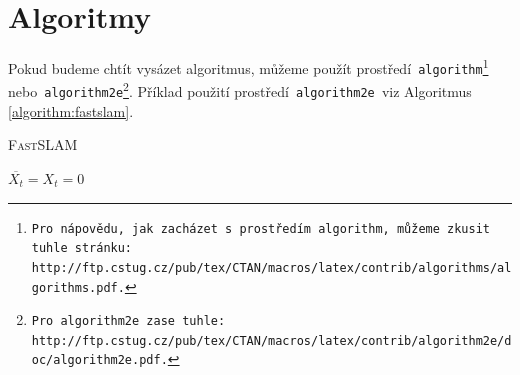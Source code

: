 \documentclass[a4paper, 11pt]{article}
\begin{document}
	\bigskip
	\pagebreak


	\section{Algoritmy}
	\label{section:algoritmy}

	Pokud budeme chtít vysázet algoritmus, můžeme použít prostředí\texttt{ algorithm\footnote{
		Pro nápovědu, jak zacházet s prostředím\texttt{ algorithm,} můžeme zkusit tuhle stránku: \\
		http://ftp.cstug.cz/pub/tex/CTAN/macros/latex/contrib/algorithms/algorithms.pdf.
	} }
	nebo\texttt{ algorithm2e\footnote{
		Pro\texttt{ algorithm2e }zase tuhle:
		http://ftp.cstug.cz/pub/tex/CTAN/macros/latex/contrib/algorithm2e/doc/algorithm2e.pdf.
	}}. Příklad použití prostředí\texttt{ algorithm2e }viz Algoritmus \ref{algorithm:fastslam}. \\
	\IncMargin{1em}
	\begin{algorithm}
		\caption{\textsc{FastSLAM}}
		\label{algorithm:fastslam}

		\SetNlSkip{0.2em}
		\SetInd{1em}{1em}

		\Indm
		\Indp
		\BlankLine

		$ \overline{X_t} = X_t = 0 $ \\



	\end{algorithm}
	\DecMargin{1em}
\end{document}
